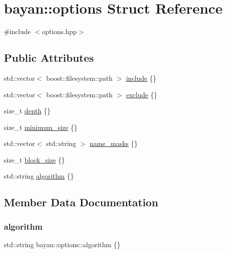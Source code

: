 \hypertarget{structbayan_1_1options}{}\section{bayan\+:\+:options Struct Reference}
\label{structbayan_1_1options}


{\ttfamily \#include $<$options.\+hpp$>$}

\subsection*{Public Attributes}
\begin{DoxyCompactItemize}
\item 
std\+::vector$<$ boost\+::filesystem\+::path $>$ \hyperlink{structbayan_1_1options_a70d39c9cc1e3f0abbed5120bf4f905a8}{include} \{\}
\item 
std\+::vector$<$ boost\+::filesystem\+::path $>$ \hyperlink{structbayan_1_1options_a502a24e54aebe8dc1ff92dda9b051874}{exclude} \{\}
\item 
size\+\_\+t \hyperlink{structbayan_1_1options_a388ae65a4e37c117102246d331d35841}{depth} \{\}
\item 
size\+\_\+t \hyperlink{structbayan_1_1options_a04bf4ca814015adfba86f01e6201ca3c}{minimum\+\_\+size} \{\}
\item 
std\+::vector$<$ std\+::string $>$ \hyperlink{structbayan_1_1options_a9eaad24fb60c372c5f21b06e2d6bd051}{name\+\_\+masks} \{\}
\item 
size\+\_\+t \hyperlink{structbayan_1_1options_a933b3640331398d9c27b4e08790f8046}{block\+\_\+size} \{\}
\item 
std\+::string \hyperlink{structbayan_1_1options_a1eb16ba1d461fa60a519b902b00e35e0}{algorithm} \{\}
\end{DoxyCompactItemize}


\subsection{Member Data Documentation}
\mbox{\label{structbayan_1_1options_a1eb16ba1d461fa60a519b902b00e35e0}} 
\subsubsection{\texorpdfstring{algorithm}{algorithm}}
{\footnotesize\ttfamily std\+::string bayan\+::options\+::algorithm \{\}}

